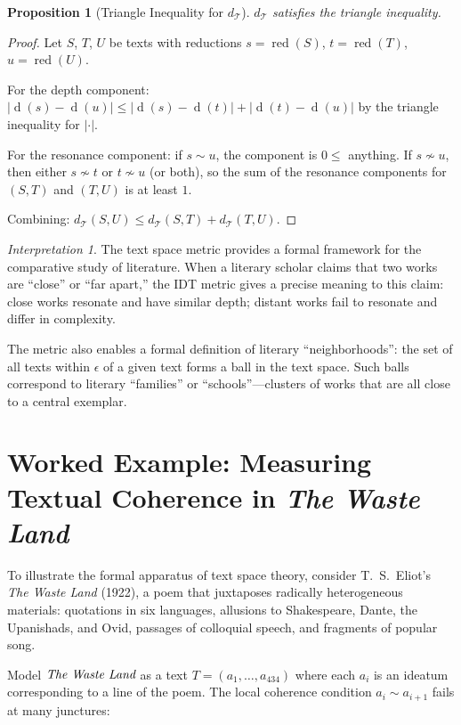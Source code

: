 \documentclass[11pt,openany]{book}
\theoremstyle{definition}
\theoremstyle{plain}
\newtheorem{proposition}[axiom]{Proposition}
\theoremstyle{remark}
\newtheorem{interpretation}[axiom]{Interpretation}
\newcommand{\res}{\sim}                      %
\newcommand{\depth}{\operatorname{d}}       %
\begin{document}
\begin{proposition}[Triangle Inequality for $d_{\mathcal{T}}$]
$d_{\mathcal{T}}$ satisfies the triangle inequality.
\end{proposition}

\begin{proof}
Let $S$, $T$, $U$ be texts with reductions $s = \operatorname{red}(S)$, $t = \operatorname{red}(T)$, $u = \operatorname{red}(U)$.

For the depth component: $|\depth(s) - \depth(u)| \leq |\depth(s) - \depth(t)| + |\depth(t) - \depth(u)|$ by the triangle inequality for $|\cdot|$.

For the resonance component: if $s \res u$, the component is $0 \leq$ anything. If $s \not\res u$, then either $s \not\res t$ or $t \not\res u$ (or both), so the sum of the resonance components for $(S, T)$ and $(T, U)$ is at least $1$.

Combining: $d_{\mathcal{T}}(S, U) \leq d_{\mathcal{T}}(S, T) + d_{\mathcal{T}}(T, U)$.
\end{proof}

\begin{interpretation}
The text space metric provides a formal framework for the comparative study of literature. When a literary scholar claims that two works are ``close'' or ``far apart,'' the IDT metric gives a precise meaning to this claim: close works resonate and have similar depth; distant works fail to resonate and differ in complexity.

The metric also enables a formal definition of literary ``neighborhoods'': the set of all texts within $\epsilon$ of a given text forms a ball in the text space. Such balls correspond to literary ``families'' or ``schools''---clusters of works that are all close to a central exemplar.
\end{interpretation}

\section{Worked Example: Measuring Textual Coherence in \emph{The Waste Land}}

To illustrate the formal apparatus of text space theory, consider T.~S.~Eliot's \emph{The Waste Land} (1922), a poem that juxtaposes radically heterogeneous materials: quotations in six languages, allusions to Shakespeare, Dante, the Upanishads, and Ovid, passages of colloquial speech, and fragments of popular song.

Model $\emph{The Waste Land}$ as a text $T = (a_1, \ldots, a_{434})$ where each $a_i$ is an ideatum corresponding to a line of the poem. The local coherence condition $a_i \res a_{i+1}$ fails at many junctures:
\end{document}
